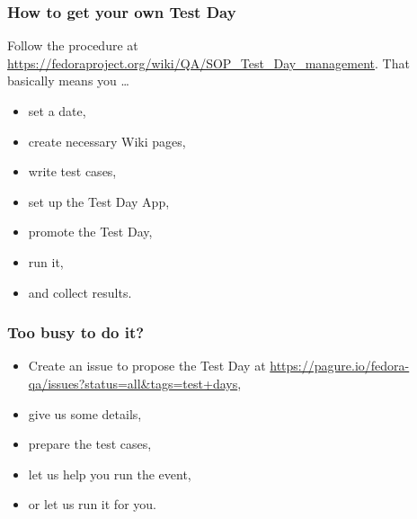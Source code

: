 \documentclass[12pt]{beamer}
\begin{document}
\begin{frame}
\frametitle{How to get your own Test Day}
Follow the procedure at {\color{blue}\url{https://fedoraproject.org/wiki/QA/SOP_Test_Day_management}}. That basically means you \ldots{}
\begin{itemize}
		\item set a date,
		\item create necessary Wiki pages,
		\item write test cases,
		\item set up the Test Day App,
		\item promote the Test Day,
		\item run it,
		\item and collect results.
\end{itemize}
\end{frame}

\begin{frame}
\frametitle{Too busy to do it?}

\begin{itemize}
	\item Create an issue to propose the Test Day at {\color{blue}\url{https://pagure.io/fedora-qa/issues?status=all&tags=test+days}},
	\item give us some details,
	\item prepare the test cases,
	\item let us help you run the event,
	\item or let us run it for you.
\end{itemize}

\end{frame}
\end{document}

